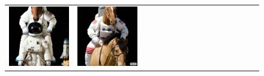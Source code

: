\begin{figure}
\begin{adjustwidth}{-0.8in}{-0.5in}
\begin{tabular}{cccccccccccccccccccc}
\multicolumn{3}{c}{\includegraphics[width=\twobytwocolwidth\textwidth]{figures/limitations/astrohorse1.jpg}} &
\multicolumn{3}{c}{\includegraphics[width=\twobytwocolwidth\textwidth]{figures/limitations/astrohorse2.jpg}} &&

\end{tabular}
\end{adjustwidth}
\end{figure}
